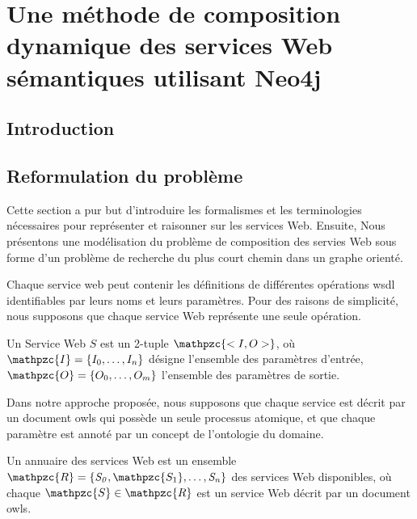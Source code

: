\chapter{Une méthode de composition dynamique des services Web
  sémantiques utilisant Neo4j}
\label{ch:approach}

\section*{Introduction}
 

\newpage
\section{Reformulation du problème}
\label{sec:reformulation}

Cette section a pur but d'introduire les formalismes et les
terminologies nécessaires pour représenter et raisonner sur les
services Web. Ensuite, Nous présentons une modélisation du problème de
composition des servies Web sous forme d'un problème de recherche du
plus court chemin dans un graphe orienté.\bigskip

Chaque service web peut contenir les définitions de différentes
opérations \acrshort{wsdl} identifiables par leurs noms et leurs
paramètres. Pour des raisons de simplicité, nous supposons que chaque
service Web représente une seule opération.\medskip

\begin{mydef}
  Un Service Web $S$ est un 2-tuple $\mathpzc{<I,O>}$, où
  $\mathpzc{I}=\{I_0, \dots, I_n\}$ désigne l'ensemble des paramètres
  d'entrée, $\mathpzc{O}=\{O_0, \dots, O_m\}$ l'ensemble des
  paramètres de sortie.
\end{mydef}



Dans notre approche proposée, nous supposons que chaque service est
décrit par un document \acrshort{owls} qui possède un seule processus
atomique, et que chaque paramètre est annoté par un concept de
l'ontologie du domaine.\medskip

\begin{mydef}
  Un annuaire des services Web est un ensemble
  $\mathpzc{R} =\{\mathit{S_0}, \mathpzc{S_1}, \dots,\mathit{S_n}\}$
  des services Web disponibles, où chaque
  $\mathpzc{S} \in \mathpzc{R}$ est un service Web décrit par un
  document \acrshort{owls}.
\end{mydef}

